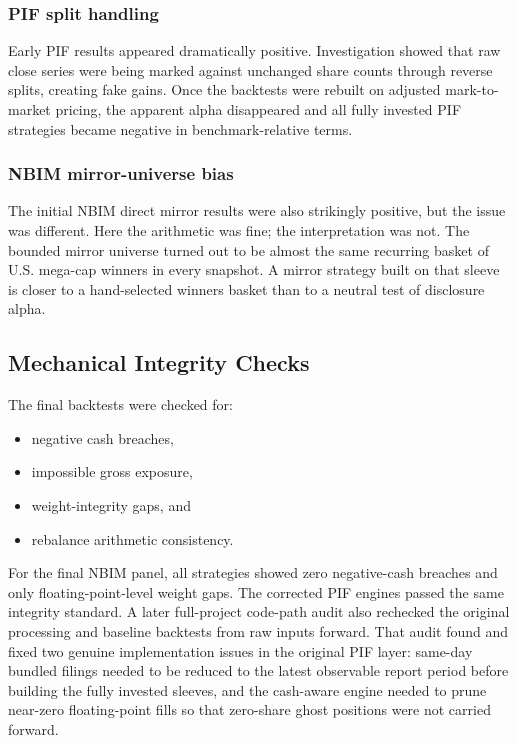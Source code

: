 \documentclass[conference]{IEEEtran}
\begin{document}
\subsubsection{PIF split handling}

Early PIF results appeared dramatically positive. Investigation showed that raw close series were being marked against unchanged share counts through reverse splits, creating fake gains. Once the backtests were rebuilt on adjusted mark-to-market pricing, the apparent alpha disappeared and all fully invested PIF strategies became negative in benchmark-relative terms.

\subsubsection{NBIM mirror-universe bias}

The initial NBIM direct mirror results were also strikingly positive, but the issue was different. Here the arithmetic was fine; the interpretation was not. The bounded mirror universe turned out to be almost the same recurring basket of U.S. mega-cap winners in every snapshot. A mirror strategy built on that sleeve is closer to a hand-selected winners basket than to a neutral test of disclosure alpha.

\subsection{Mechanical Integrity Checks}

The final backtests were checked for:
\begin{itemize}[leftmargin=1.4em]
    \item negative cash breaches,
    \item impossible gross exposure,
    \item weight-integrity gaps, and
    \item rebalance arithmetic consistency.
\end{itemize}

For the final NBIM panel, all strategies showed zero negative-cash breaches and only floating-point-level weight gaps. The corrected PIF engines passed the same integrity standard. A later full-project code-path audit also rechecked the original processing and baseline backtests from raw inputs forward. That audit found and fixed two genuine implementation issues in the original PIF layer: same-day bundled filings needed to be reduced to the latest observable report period before building the fully invested sleeves, and the cash-aware engine needed to prune near-zero floating-point fills so that zero-share ghost positions were not carried forward.
\end{document}
